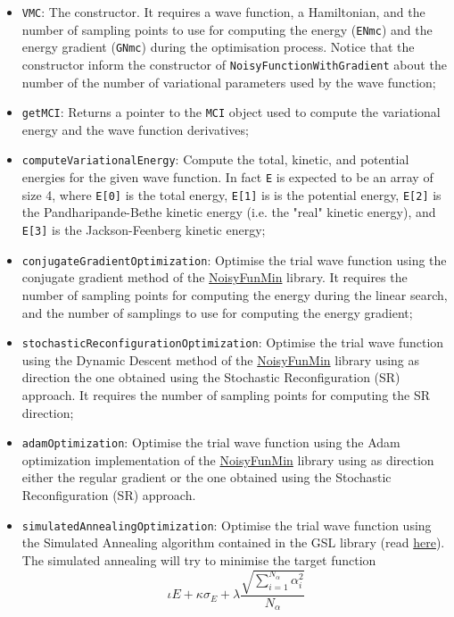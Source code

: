\documentclass[11pt,a4paper,twoside]{article}
\begin{document}
\begin{itemize}
\item \verb+VMC+: The constructor. It requires a wave function, a Hamiltonian, and the number of sampling points to use for computing the energy (\verb+ENmc+) and the energy gradient (\verb+GNmc+) during the optimisation process. Notice that the constructor inform the constructor of \verb+NoisyFunctionWithGradient+ about the number of the number of variational parameters used by the wave function;
\item \verb+getMCI+: Returns a pointer to the \verb+MCI+ object used to compute the variational energy and the wave function derivatives;
\item \verb+computeVariationalEnergy+: Compute the total, kinetic, and potential energies for the given wave function. In fact \verb+E+ is expected to be an array of size 4, where \verb+E[0]+ is the total energy, \verb+E[1]+ is is the potential energy, \verb+E[2]+ is the Pandharipande-Bethe kinetic energy (i.e. the "real" kinetic energy), and \verb+E[3]+ is the Jackson-Feenberg kinetic energy;
\item \verb+conjugateGradientOptimization+: Optimise the trial wave function using the conjugate gradient method of the \href{https://github.com/francesco086/NoisyFunMin}{NoisyFunMin} library. It requires the number of sampling points for computing the energy during the linear search, and the number of samplings to use for computing the energy gradient;
\item \verb+stochasticReconfigurationOptimization+: Optimise the trial wave function using the Dynamic Descent method of the \href{https://github.com/francesco086/NoisyFunMin}{NoisyFunMin} library using as direction the one obtained using the Stochastic Reconfiguration (SR) approach. It requires the number of sampling points for computing the SR direction;
\item \verb+adamOptimization+: Optimise the trial wave function using the Adam optimization implementation of the  \href{https://github.com/francesco086/NoisyFunMin}{NoisyFunMin} library using as direction either the regular gradient or the one obtained using the Stochastic Reconfiguration (SR) approach.
\item \verb+simulatedAnnealingOptimization+: Optimise the trial wave function using the Simulated Annealing algorithm contained in the GSL library (read \href{https://www.gnu.org/software/gsl/doc/html/siman.html}{here}). The simulated annealing will try to minimise the target function
  $$
  \iota E + \kappa \sigma_E + \lambda \frac{\sqrt{ \sum_{i=1}^{N_{\alpha}} \alpha_i^2 }}{N_{\alpha}}
$$
\end{itemize}
\end{document}
